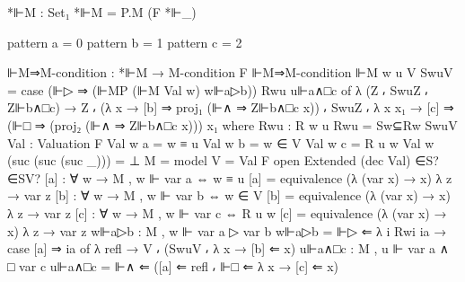 \begin{spverbatim}
  *⊩M : Set₁
  *⊩M = P.M (F *⊩_)

  pattern a = 0
  pattern b = 1
  pattern c = 2

  ⊩M⇒M-condition : *⊩M → M-condition F
  ⊩M⇒M-condition ⊩M {w} {u} {V} SwuV
    = case (⊩▷ ⇒ (⊩MP (⊩M Val w) w⊩a▷b)) Rwu u⊩a∧□c of
      λ { (Z ⸴ SwuZ ⸴ Z⊩b∧□c) → Z ⸴ (λ {x → [b] ⇒ proj₁ (⊩∧ ⇒ Z⊩b∧□c x)}) ⸴ SwuZ
      ⸴ λ {x x₁ → [c] ⇒ (⊩□ ⇒ (proj₂ (⊩∧ ⇒ Z⊩b∧□c x))) x₁}}
    where
    Rwu : R w u
    Rwu = Sw⊆Rw SwuV
    Val : Valuation F
    Val w a = w ≡ u
    Val w b = w ∈ V
    Val w c = R u w
    Val w (suc (suc (suc _))) = ⊥
    M = model {V = Val} F
    open Extended (dec Val) ∈S? ∈SV?
    [a] : ∀ {w} → M , w ⊩ var a ⇔ w ≡ u
    [a] = equivalence (λ { (var x) → x}) λ {z → var z}
    [b] : ∀ {w} → M , w ⊩ var b ⇔ w ∈ V
    [b] = equivalence (λ { (var x) → x}) λ {z → var z}
    [c] : ∀ {w} → M , w ⊩ var c ⇔ R u w
    [c] = equivalence (λ { (var x) → x}) λ {z → var z}
    w⊩a▷b : M , w ⊩ var a ▷ var b
    w⊩a▷b = ⊩▷ ⇐ λ { {i} Rwi ia → case [a] ⇒ ia of λ {refl → V ⸴ (SwuV ⸴ λ {x → [b] ⇐ x})}}
    u⊩a∧□c : M , u ⊩ var a ∧ □ var c
    u⊩a∧□c = ⊩∧ ⇐ ([a] ⇐ refl ⸴ ⊩□ ⇐ λ x → [c] ⇐ x)

\end{spverbatim}
